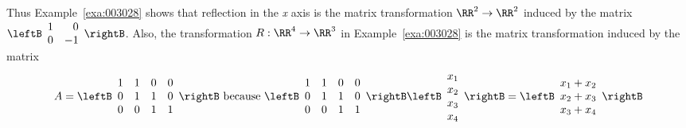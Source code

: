 Thus Example~\ref{exa:003028} shows that reflection in the \textit{x} axis is the matrix transformation $\RR^2 \to \RR^2$ induced by the matrix $\leftB \begin{array}{rr}
1 & 0 \\
0 & -1
\end{array} \rightB$. Also, the transformation $R : \RR^4 \to \RR^3$ in Example~\ref{exa:003028} is the matrix transformation induced by the matrix
\begin{equation*}
A = \leftB \begin{array}{rrrr}
1 & 1 & 0 & 0 \\
0 & 1 & 1 & 0 \\
0 & 0 & 1 & 1 \\
\end{array} \rightB \mbox{ because } \leftB \begin{array}{rrrr}
1 & 1 & 0 & 0 \\
0 & 1 & 1 & 0 \\
0 & 0 & 1 & 1 \\
\end{array} \rightB \leftB \begin{array}{c}
x_{1} \\
x_{2} \\
x_{3} \\
x_{4}
\end{array} \rightB = \leftB \begin{array}{c}
x_{1} + x_{2} \\
x_{2} + x_{3} \\
x_{3} + x_{4}
\end{array} \rightB
\end{equation*}

